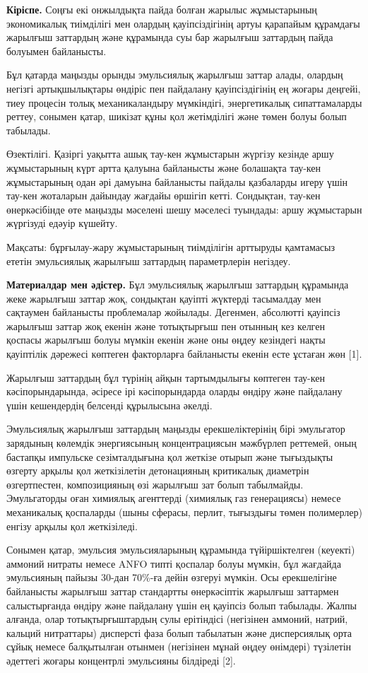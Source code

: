 {\bfseries Кіріспе.} Соңғы екі онжылдықта пайда болған жарылыс жұмыстарының
экономикалық тиімділігі мен олардың қауіпсіздігінің артуы қарапайым
құрамдағы жарылғыш заттардың және құрамында суы бар жарылғыш заттардың
пайда болуымен байланысты.

Бұл қатарда маңызды орынды эмульсиялық жарылғыш заттар алады, олардың
негізгі артықшылықтары өндіріс пен пайдалану қауіпсіздігінің ең жоғары
деңгейі, тиеу процесін толық механикаландыру мүмкіндігі, энергетикалық
сипаттамаларды реттеу, сонымен қатар, шикізат құны қол жетімділігі және
төмен болуы болып табылады.

Өзектілігі. Қазіргі уақытта ашық тау-кен жұмыстарын жүргізу кезінде аршу
жұмыстарының күрт артта қалуына байланысты және болашақта тау-кен
жұмыстарының одан әрі дамуына байланысты пайдалы қазбаларды игеру үшін
тау-кен жоталарын дайындау жағдайы өршігіп кетті. Сондықтан, тау-кен
өнеркәсібінде өте маңызды мәселені шешу мәселесі туындады: аршу
жұмыстарын жүргізуді едәуір күшейту.

Мақсаты: бұрғылау-жару жұмыстарының тиімділігін арттыруды қамтамасыз
ететін эмульсиялық жарылғыш заттардың параметрлерін негіздеу.

{\bfseries Материалдар мен әдістер.} Бұл эмульсиялық жарылғыш заттардың
құрамында жеке жарылғыш заттар жоқ, сондықтан қауіпті жүктерді
тасымалдау мен сақтаумен байланысты проблемалар жойылады. Дегенмен,
абсолютті қауіпсіз жарылғыш заттар жоқ екенін және тотықтырғыш пен
отынның кез келген қоспасы жарылғыш болуы мүмкін екенін және оны өңдеу
кезіндегі нақты қауіптілік дәрежесі көптеген факторларға байланысты
екенін есте ұстаған жөн {[}1{]}.

Жарылғыш заттардың бұл түрінің айқын тартымдылығы көптеген тау-кен
кәсіпорындарында, әсіресе ірі кәсіпорындарда оларды өндіру және
пайдалану үшін кешендердің белсенді құрылысына әкелді.

Эмульсиялық жарылғыш заттардың маңызды ерекшеліктерінің бірі эмульгатор
зарядының көлемдік энергиясының концентрациясын мәжбүрлеп реттемей, оның
бастапқы импульске сезімталдығына қол жеткізе отырып және тығыздықты
өзгерту арқылы қол жеткізілетін детонацияның критикалық диаметрін
өзгертпестен, композицияның өзі жарылғыш зат болып табылмайды.
Эмульгаторды оған химиялық агенттерді (химиялық газ генерациясы) немесе
механикалық қоспаларды (шыны сферасы, перлит, тығыздығы төмен
полимерлер) енгізу арқылы қол жеткізіледі.

Сонымен қатар, эмульсия эмульсияларының құрамында түйіршіктелген
(кеуекті) аммоний нитраты немесе ANFO типті қоспалар болуы мүмкін, бұл
жағдайда эмульсияның пайызы 30-дан 70\%-ға дейін өзгеруі мүмкін. Осы
ерекшелігіне байланысты жарылғыш заттар стандартты өнеркәсіптік жарылғыш
заттармен салыстырғанда өндіру және пайдалану үшін ең қауіпсіз болып
табылады. Жалпы алғанда, олар тотықтырғыштардың сулы ерітіндісі
(негізінен аммоний, натрий, кальций нитраттары) дисперсті фаза болып
табылатын және дисперсиялық орта сұйық немесе балқытылған отынмен
(негізінен мұнай өңдеу өнімдері) түзілетін әдеттегі жоғары концентрлі
эмульсияны білдіреді {[}2{]}.

